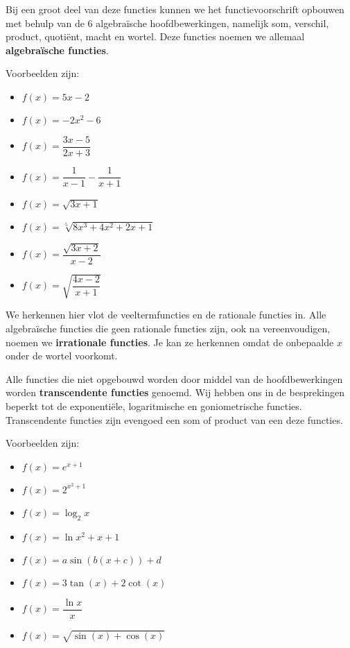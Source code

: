 \documentclass[12pt,twoside,a4paper]{article}
\begin{document}
Bij een groot deel van deze functies kunnen we het functievoorschrift opbouwen met behulp van de 6 algebraïsche hoofdbewerkingen, namelijk som, verschil, product, quotiënt, macht en wortel. Deze functies noemen we allemaal {\bf algebraïsche functies}.

Voorbeelden zijn:
\begin{multicols}{2}
  \begin{itemize}
    \item $\displaystyle f(x)=5x-2$
    \item $\displaystyle f(x)=-2x^2-6$
    \item $\displaystyle f(x)=\dfrac{3x-5}{2x+3}$
    \item $\displaystyle f(x)=\dfrac{1}{x-1}-\dfrac{1}{x+1}$
    \item $\displaystyle f(x)=\sqrt{3x+1}$
    \item $\displaystyle f(x)=\sqrt[5]{8x^3+4x^2+2x+1}$
    \item $\displaystyle f(x)=\dfrac{\sqrt{3x+2}}{x-2}$
    \item $\displaystyle f(x)=\sqrt{\dfrac{4x-2}{x+1}}$
  \end{itemize}
\end{multicols}

We herkennen hier vlot de veeltermfuncties en de rationale functies in. Alle algebraïsche functies die geen rationale functies zijn, ook na vereenvoudigen, noemen we {\bf irrationale functies}. Je kan ze herkennen omdat de onbepaalde $x$ onder de wortel voorkomt.

Alle functies die niet opgebouwd worden door middel van de hoofdbewerkingen worden {\bf transcendente functies} genoemd. Wij hebben ons in de besprekingen beperkt tot de exponentiële, logaritmische en goniometrische functies. Transcendente functies zijn evengoed een som of product van een deze functies.

Voorbeelden zijn:
\begin{multicols}{2}
  \begin{itemize}
    \item $\displaystyle f(x)=e^{x+1}$
    \item $\displaystyle f(x)=2^{x^2+1}$
    \item $\displaystyle f(x)=\log_2{x}$
    \item $\displaystyle f(x)=\ln{x^2+x+1}$
    \item $\displaystyle f(x)=a\sin(b(x+c))+d$
    \item $\displaystyle f(x)=3\tan(x)+2\cot(x)$
    \item $\displaystyle f(x)=\dfrac{\ln{x}}{x}$
    \item $\displaystyle f(x)=\sqrt{\sin(x)+\cos(x)}$
  \end{itemize}
\end{multicols}
\end{document}
